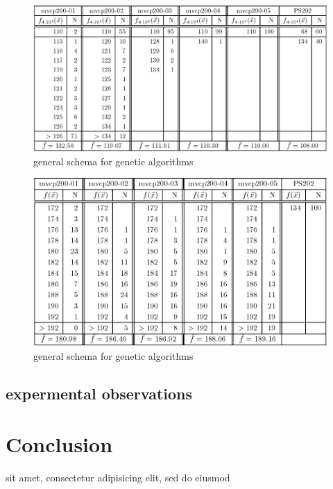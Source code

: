 \documentclass[12pt]{article}
\begin{document}
\begin{figure}[!htbp]
\centering
\includegraphics[width=1\textwidth]{t3}
\caption{general schema for genetic algorithms}
\label{fig:t3}
\end{figure}

\begin{figure}[!htbp]
\centering
\includegraphics[width=1\textwidth]{t4}
\caption{general schema for genetic algorithms}
\label{fig:t4}
\end{figure}

\subsection{expermental observations}


\section{Conclusion}
sit amet, consectetur adipisicing elit, sed do eiusmod


\pagebreak


\cleardoublepage{}
%
%
\printbibliography

\end{document}
